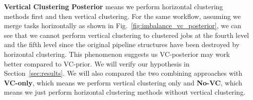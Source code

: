 \textbf{Vertical Clustering Posterior} means we perform horizontal clustering methods first and then vertical clustering. For the same workflow, assuming we merge tasks horizontally as shown in Fig.~\ref{fig:imbalance_vc_posterior}, we can see that we cannot perform vertical clustering to clustered jobs at the fourth level and the fifth level since the original pipeline structures have been destroyed by horizontal clustering. This phenomenon suggests us VC-posterior may work better compared to VC-prior. We will verify our hypothesis in Section~\ref{sec:results}. We will also compared the two combining approaches with \textbf{VC-only}, which means we perform vertical clustering only and \textbf{No-VC}, which means we just perform horizontal clustering methods without vertical clustering. 





